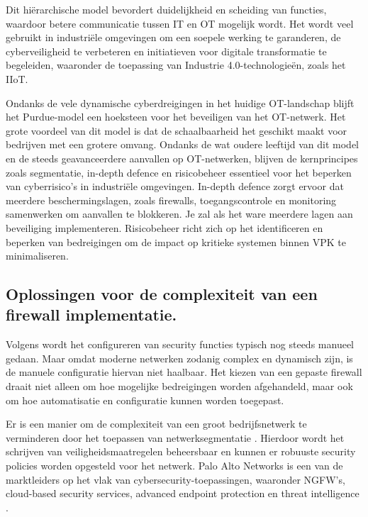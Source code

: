 \vspace{5mm}
Dit hiërarchische model bevordert duidelijkheid en scheiding van functies, waardoor betere communicatie tussen IT en OT mogelijk wordt. Het wordt veel gebruikt in industriële omgevingen om een soepele werking te garanderen, de cyberveiligheid te verbeteren en initiatieven voor digitale transformatie te begeleiden, waaronder de toepassing van Industrie 4.0-technologieën, zoals het IIoT. \autocite{Commers2025}

\vspace{5mm}
Ondanks de vele dynamische cyberdreigingen in het huidige OT-landschap blijft het Purdue-model een hoeksteen voor het beveiligen van het OT-netwerk. Het grote voordeel van dit model is dat de schaalbaarheid het geschikt maakt voor bedrijven met een grotere omvang. Ondanks de wat oudere leeftijd van dit model en de steeds geavanceerdere aanvallen op OT-netwerken, blijven de kernprincipes zoals segmentatie, in-depth defence en risicobeheer essentieel voor het beperken van cyberrisico’s in industriële omgevingen. In-depth defence zorgt ervoor dat meerdere beschermingslagen, zoals firewalls, toegangscontrole en monitoring samenwerken om aanvallen te blokkeren. Je zal als het ware meerdere lagen aan beveiliging implementeren. Risicobeheer richt zich op het identificeren en beperken van bedreigingen om de impact op kritieke systemen binnen VPK te minimaliseren.

\subsection{Oplossingen voor de complexiteit van een firewall implementatie.}

Volgens \textcite{Bringhenti2023} wordt het configureren van security functies typisch nog steeds manueel gedaan. Maar omdat moderne netwerken zodanig complex en dynamisch zijn, is de manuele configuratie hiervan niet haalbaar. Het kiezen van een gepaste firewall draait niet alleen om hoe mogelijke bedreigingen worden afgehandeld, maar ook om hoe automatisatie en configuratie kunnen worden toegepast.

\vspace{5mm}
Er is een manier om de complexiteit van een groot bedrijfsnetwerk te verminderen door het toepassen van netwerksegmentatie \autocite{Bringhenti2023}. Hierdoor wordt het schrijven van veiligheidsmaatregelen beheersbaar en kunnen er robuuste security policies worden opgesteld voor het netwerk. Palo Alto Networks is een van de marktleiders op het vlak van cybersecurity-toepassingen, waaronder NGFW’s, cloud-based security services, advanced endpoint protection en threat intelligence \autocite{TechnicalWhitepaper2014}.

